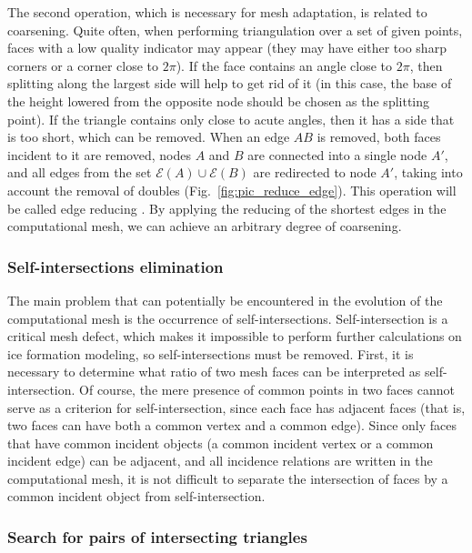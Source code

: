 The second operation, which is necessary for mesh adaptation, is related to coarsening.
Quite often, when performing triangulation over a set of given points, faces with a low quality indicator may appear (they may have either too sharp corners or a corner close to $2 \pi$).
If the face contains an angle close to $2 \pi$, then splitting along the largest side will help to get rid of it (in this case, the base of the height lowered from the opposite node should be chosen as the splitting point).
If the triangle contains only close to acute angles, then it has a side that is too short, which can be removed.
When an edge $AB$ is removed, both faces incident to it are removed, nodes $A$ and $B$ are connected into a single node $A'$, and all edges from the set $\mathscr{E}(A) \cup \mathscr{E} (B)$ are redirected to node $A'$, taking into account the removal of doubles (Fig.~\ref{fig:pic_reduce_edge}).
This operation will be called edge reducing \cite{Panchal}.
By applying the reducing of the shortest edges in the  computational
mesh, we can achieve an arbitrary degree of coarsening.


\subsubsection{Self-intersections elimination}

The main problem that can potentially be encountered in the evolution of the computational mesh is the occurrence of self-intersections.
Self-intersection is a critical mesh defect, which makes it impossible to perform further calculations on ice formation modeling, so self-intersections must be removed.
First, it is necessary to determine what ratio of two mesh faces can be interpreted as self-intersection.
Of course, the mere presence of common points in two faces cannot serve as a criterion for self-intersection, since each face has adjacent faces (that is, two faces can have both a common vertex and a common edge).
Since only faces that have common incident objects  (a common
incident vertex or a common incident edge) can be adjacent, and all
incidence relations are written in the computational mesh, it is not
difficult to separate the intersection of faces by a common incident
object from self-intersection.

\subsubsection{Search for pairs of intersecting triangles}

